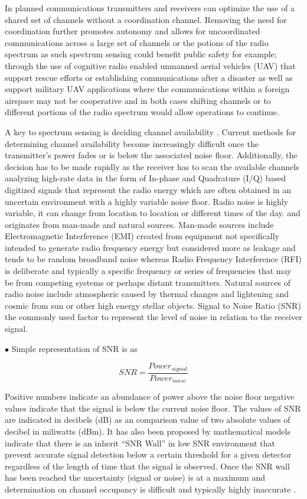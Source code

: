 \documentclass[conference]{IEEEtran}
\begin{document}
In planned communications transmitters and receivers can optimize the use of a shared set of channels without a coordination channel. Removing the need for coordination further promotes autonomy and allows for uncoordinated communications across a large set of channels or the potions of the radio spectrum as such spectrum sensing could benefit public safety for example; through the use of cognitive radio enabled unmanned aerial vehicles (UAV) that support rescue efforts or establishing communications after a disaster \cite{b2} as well as support military UAV applications \cite{b3} where the communications within a foreign airspace may not be cooperative and in both cases shifting channels or to different portions of the radio spectrum would allow operations to continue.

A key to spectrum sensing is deciding channel availability \cite{b4}. Current methods for determining channel availability become increasingly difficult once the transmitter's power fades or is below the associated noise floor.  Additionally, the decision has to be made rapidly as the receiver has to scan the available channels analyzing high-rate data in the form of In-phase and Quadrature (I/Q) based digitized signals that represent the radio energy which are often obtained in an uncertain environment with a highly variable noise floor. Radio noise is highly variable, it can change from location to location or different times of the day.  and originates from man-made and natural sources. Man-made sources include Electromagnetic Interference (EMI) created from equipment not specifically intended to generate radio frequency energy but considered more as leakage and tends to be random broadband noise whereas Radio Frequency Interference (RFI) is deliberate and typically a specific frequency or series of frequencies that may be from competing systems or perhaps distant transmitters. Natural sources of radio noise include atmospheric caused by thermal changes and lightening and cosmic from sun or other high energy stellar objects. Signal to Noise Ratio (SNR) the commonly used factor to represent the level of noise in relation to the receiver signal.  

$\bullet$ Simple representation of SNR is as

\[SNR = \frac{Power_{signal}}{Power_{noise}}\]

Positive numbers indicate an abundance of power above the noise floor negative values indicate that the signal is below the current noise floor. The values of SNR are indicated in decibels (dB) as an comparison value of two absolute values of decibel in miliwatts (dBm). It has also been proposed by mathematical models indicate that there is an inherit “SNR Wall” \cite{b5} in low SNR environment that prevent accurate signal detection below a certain threshold for a given detector regardless of the length of time that the signal is observed. Once the SNR wall has been reached the uncertainty (signal or noise) is at a maximum and determination on channel occupancy is difficult and typically highly inaccurate \cite{b6}.
\end{document}
